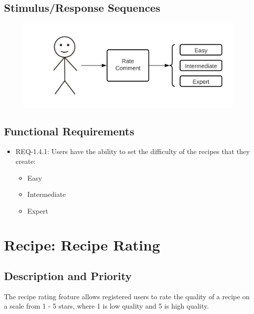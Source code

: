 \documentclass{scrreprt}
\begin{document}
\subsection{Stimulus/Response Sequences}

\begin{figure}[H]\centering
    \includegraphics[width=\columnwidth]{FlowCharts/Recipe-Difficulty.png}
\end{figure}

\subsection{Functional Requirements}

\begin{itemize}
    \item REQ-1.4.1: Users have the ability to set the difficulty of the recipes that they create:
        \begin{itemize}
            \item Easy
            \item Intermediate
            \item Expert
        \end{itemize}
\end{itemize}

\section{Recipe: Recipe Rating}

\subsection{Description and Priority}

The recipe rating feature allows registered users to rate the quality of a recipe on a scale from 1 - 5 stars, where 1 is low quality and 5 is high quality.
\end{document}
